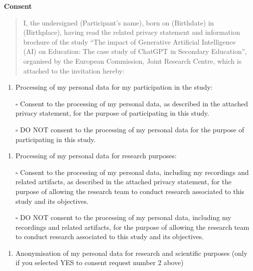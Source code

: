 \documentclass[
  12pt,
]{article}
\providecommand{\tightlist}{%
  \setlength{\itemsep}{0pt}\setlength{\parskip}{0pt}}
\begin{document}
\textbf{Consent}

\begin{quote}
I, the undersigned (Participant's name), born on (Birthdate) in (Birthplace), having read the related privacy statement and information brochure of the study ``The impact of Generative Artificial Intelligence (AI) on Education: The case study of ChatGPT in Secondary Education'', organised by the European Commission, Joint Research Centre, which is attached to the invitation hereby:
\end{quote}

\begin{enumerate}
\def\labelenumi{(\arabic{enumi})}
\tightlist
\item
  Processing of my personal data for my participation in the study:
\end{enumerate}

\begin{itemize}
\tightlist
\item[$\square$]
  Consent to the processing of my personal data, as described in the attached privacy statement, for the purpose of participating in this study.
\item[$\square$]
  DO NOT consent to the processing of my personal data for the purpose of participating in this study.
\end{itemize}

\begin{enumerate}
\def\labelenumi{(\arabic{enumi})}
\setcounter{enumi}{1}
\tightlist
\item
  Processing of my personal data for research purposes:
\end{enumerate}

\begin{itemize}
\tightlist
\item[$\square$]
  Consent to the processing of my personal data, including my recordings and related artifacts, as described in the attached privacy statement, for the purpose of allowing the research team to conduct research associated to this study and its objectives.
\item[$\square$]
  DO NOT consent to the processing of my personal data, including my recordings and related artifacts, for the purpose of allowing the research team to conduct research associated to this study and its objectives.
\end{itemize}

\begin{enumerate}
\def\labelenumi{(\arabic{enumi})}
\setcounter{enumi}{2}
\tightlist
\item
  Anonymisation of my personal data for research and scientific purposes (only if you selected YES to consent request number 2 above)
\end{enumerate}
\end{document}
